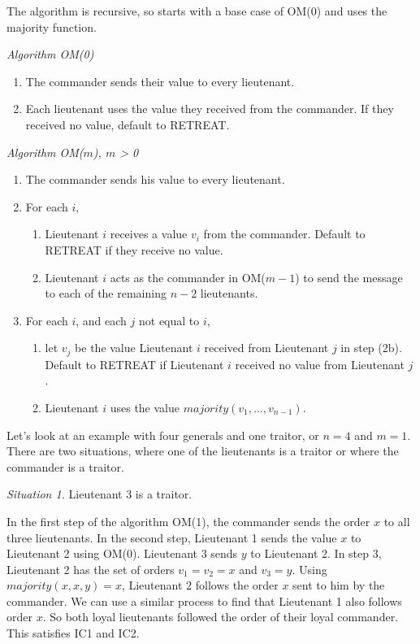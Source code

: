\documentclass[10pt]{amsart}
\begin{document}
The algorithm is recursive, so starts with a base case of OM(0) and uses the majority function.

\noindent\emph{Algorithm OM(0)}
\vspace{-10pt}
\begin{enumerate}[label=\arabic{enumi}.]
    \item The commander sends their value to every lieutenant.
    \item {
        Each lieutenant uses the value they received from the commander. If they received no value, 
        default to RETREAT.
    }
\end{enumerate}

\noindent\emph{Algorithm OM($m$), $m$ > 0}
\vspace{-10pt}
\begin{enumerate}[label=\arabic{enumi}.]
    \item The commander sends his value to every lieutenant.
    \item For each $i$,
    \begin{enumerate}[label={\alph*.}]
        \item {
            Lieutenant $i$ receives a value $v_i$ from the commander. Default to RETREAT if they receive
            no value.
        }
        \item {
            Lieutenant $i$ acts as the commander in OM($m-1$) to send the message to each of the remaining
            $n-2$ lieutenants.
        }
    \end{enumerate}
    \item For each $i$, and each $j$ not equal to $i$,
    \begin{enumerate}[label={\alph*.}]
        \item {
            let $v_j$ be the value Lieutenant $i$ received from Lieutenant $j$ in step (2b). Default to 
            RETREAT if Lieutenant $i$ received no value from Lieutenant $j$.
        }
        \item Lieutenant $i$ uses the value $majority(v_1,...,v_{n-1})$.
    \end{enumerate}  
\end{enumerate}

Let's look at an example with four generals and one traitor, or $n=4$ and $m=1$. There are two
situations, where one of the lieutenants is a traitor or where the commander is a traitor.

\noindent \emph{Situation 1.} Lieutenant 3 is a traitor.

\begin{minipage}{.95\textwidth}%
    In the first step of the algorithm OM(1), the commander sends the order $x$ to all three lieutenants.
    In the second step, Lieutenant 1 sends the value $x$ to Lieutenant 2 using OM(0). Lieutenant 3 sends
    $y$ to Lieutenant 2. In step 3, Lieutenant 2 has the set of orders $v_1=v_2=x$ and $v_3=y$. Using
    $majority(x, x, y) = x$, Lieutenant 2 follows the order $x$ sent to him by the commander. We can use
    a similar process to find that Lieutenant 1 also follows order $x$. So both loyal lieutenants followed
    the order of their loyal commander. This satisfies IC1 and IC2.
\end{minipage}%
\end{document}

